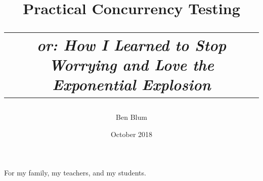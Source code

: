 \documentclass[12pt]{cmuthesis}
\begin{document}
\frontmatter

\pagestyle{empty}

\title{ %
{\bf Practical Concurrency Testing} \\
\normalsize \vspace{1em}
\begin{tabular}{c}
{\em or: How I Learned to Stop Worrying and Love the Exponential Explosion}
\end{tabular}}
\author{Ben Blum}
\date{October 2018}
\trnumber{}


\support{}
\disclaimer{}



\maketitle

\begin{dedication}
For my family, my teachers, and my students.
\end{dedication}

\pagestyle{plain} %

\newcommand\revision[1]{\cbstart{}#1\cbend\xspace}
\newcommand\revisionminor[1]{\cbstart{}#1\cbend\xspace}
\end{document}
